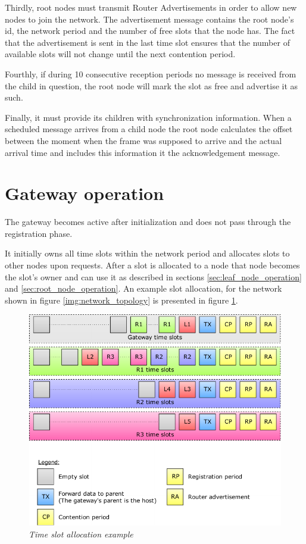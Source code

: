 Thirdly, root nodes must transmit Router Advertisements in order to allow new
nodes to join the network. The advertisement message contains the root node's
id, the network period and the number of free slots that the node has. The fact
that the advertisement is sent in the last time slot ensures that the number of
available slots will not change until the next contention period.

Fourthly, if during 10 consecutive reception periods no message is received
from the child in question, the root node will mark the slot as free and
advertise it as such.

Finally, it must provide its children with synchronization information. When a
scheduled message arrives from a child node the root node calculates the offset
between the moment when the frame was supposed to arrive and the actual arrival
time and includes this information it the acknowledgement message.

\section{Gateway operation}

The gateway becomes active after initialization and does not pass through the
registration phase.

It initially owns all time slots within the network period and allocates slots
to other nodes upon requests. After a slot is allocated to a node that node
becomes the slot's owner and can use it as described in sections
\ref{sec:leaf_node_operation} and \ref{sec:root_node_operation}. An example
slot allocation, for the network shown in figure \ref{img:network_topology} is
presented in figure \ref{img:slot_allocation}.

\begin{figure}[ht]
	\begin{center}
		\includegraphics[width=\textwidth]{img/slot_allocation.pdf}
	\end{center}
	\caption{\small \itshape{Time slot allocation example}}
	\label{img:slot_allocation}
\end{figure}


